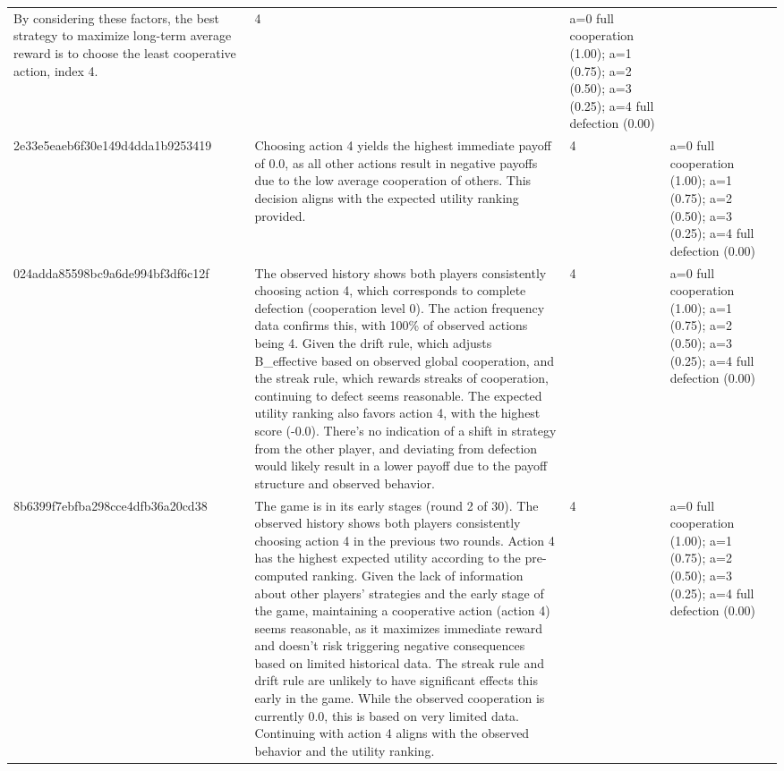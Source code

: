 \begin{tabular}{lp{8cm}ll l}
By considering these factors, the best strategy to maximize long-term average reward is to choose the least cooperative action, index 4. & 4 & a=0 full cooperation (1.00); a=1 (0.75); a=2 (0.50); a=3 (0.25); a=4 full defection (0.00) &  \\
2e33e5eaeb6f30e149d4dda1b9253419 & Choosing action 4 yields the highest immediate payoff of 0.0, as all other actions result in negative payoffs due to the low average cooperation of others. This decision aligns with the expected utility ranking provided. & 4 & a=0 full cooperation (1.00); a=1 (0.75); a=2 (0.50); a=3 (0.25); a=4 full defection (0.00) &  \\
024adda85598bc9a6de994bf3df6c12f & The observed history shows both players consistently choosing action 4, which corresponds to complete defection (cooperation level 0). The action frequency data confirms this, with 100\% of observed actions being 4. Given the drift rule, which adjusts B\_effective based on observed global cooperation, and the streak rule, which rewards streaks of cooperation, continuing to defect seems reasonable. The expected utility ranking also favors action 4, with the highest score (-0.0). There's no indication of a shift in strategy from the other player, and deviating from defection would likely result in a lower payoff due to the payoff structure and observed behavior. & 4 & a=0 full cooperation (1.00); a=1 (0.75); a=2 (0.50); a=3 (0.25); a=4 full defection (0.00) &  \\
8b6399f7ebfba298cce4dfb36a20cd38 & The game is in its early stages (round 2 of 30). The observed history shows both players consistently choosing action 4 in the previous two rounds. Action 4 has the highest expected utility according to the pre-computed ranking. Given the lack of information about other players' strategies and the early stage of the game, maintaining a cooperative action (action 4) seems reasonable, as it maximizes immediate reward and doesn't risk triggering negative consequences based on limited historical data. The streak rule and drift rule are unlikely to have significant effects this early in the game. While the observed cooperation is currently 0.0, this is based on very limited data. Continuing with action 4 aligns with the observed behavior and the utility ranking. & 4 & a=0 full cooperation (1.00); a=1 (0.75); a=2 (0.50); a=3 (0.25); a=4 full defection (0.00) &  \\

\end{tabular}
